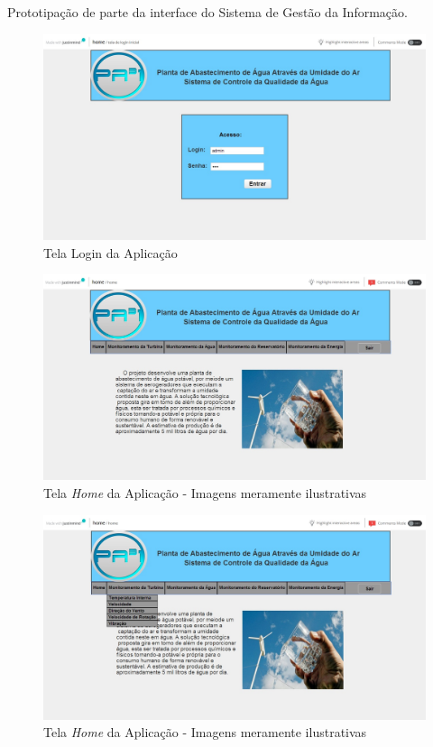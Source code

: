 \textual
\begin{center}
 {\large Prototipação de parte da interface do Sistema de Gestão da Informação.}\\[0.2cm]
 
\begin{figure}[!ht]
\centering
\includegraphics[scale=0.45]{figuras/login}
\caption[Tela Login]{Tela Login da Aplicação}
\label{tela_login}
\end{figure}

 
\begin{figure}[!ht]
\centering
\includegraphics[scale=0.45]{figuras/home}
\caption[Home]{Tela \emph{Home} da Aplicação - Imagens meramente ilustrativas}
\label{tela_home}
\end{figure}
\clearpage

\begin{figure}[!ht]
\centering
\includegraphics[scale=0.45]{figuras/menu_monitoramento_da_turbina}
\caption[Home]{Tela \emph{Home} da Aplicação - Imagens meramente ilustrativas}
\label{tela_home}
\end{figure}



\end{center}

